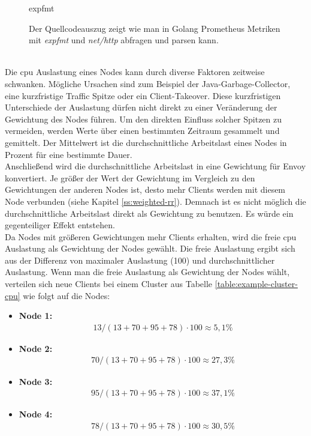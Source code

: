 \begin{figure}
    {expfmt}
    \caption{Der Quellcodeauszug zeigt wie man in Golang Prometheus Metriken mit \textit{expfmt} und \textit{net/http} abfragen und parsen kann.}
    \label{code:expfmt}
\end{figure}
\\
Die \ac{cpu} Auslastung eines Nodes kann durch diverse Faktoren zeitweise schwanken. Mögliche Ursachen sind zum Beispiel der Java-Garbage-Collector, eine kurzfristige Traffic Spitze oder ein Client-Takeover.
Diese kurzfristigen Unterschiede der Auslastung dürfen nicht direkt zu einer Veränderung der Gewichtung des Nodes führen.
Um den direkten Einfluss solcher Spitzen zu vermeiden, werden Werte über einen bestimmten Zeitraum gesammelt und gemittelt. Der Mittelwert ist die durchschnittliche Arbeitslast eines Nodes in Prozent für eine bestimmte Dauer.
\\
Anschlie{\ss}end wird die durchschnittliche Arbeitslast in eine Gewichtung für Envoy konvertiert.
Je grö{\ss}er der Wert der Gewichtung im Vergleich zu den Gewichtungen der anderen Nodes ist, desto mehr Clients werden mit diesem Node verbunden (siehe Kapitel \ref{ss:weighted-rr}).
Demnach ist es nicht möglich die durchschnittliche Arbeitslast direkt als Gewichtung zu benutzen. Es würde ein gegenteiliger Effekt entstehen.
\\
Da Nodes mit grö{\ss}eren Gewichtungen mehr Clients erhalten, wird die freie \ac{cpu} Auslastung als Gewichtung der Nodes gewählt.
Die freie Auslastung ergibt sich aus der Differenz von maximaler Auslastung (100) und durchschnittlicher Auslastung.
Wenn man die freie Auslastung als Gewichtung der Nodes wählt, verteilen sich neue Clients bei einem Cluster aus Tabelle \ref{table:example-cluster-cpu} wie folgt auf die Nodes:
\begin{itemize}
  \item \textbf{Node 1:}
    \begin{align}
      13 / (13 + 70 + 95 + 78) \cdot 100 \approx 5,1 \%
    \end{align}
  \item \textbf{Node 2:}
    \begin{align}
      70 / (13 + 70 + 95 + 78) \cdot 100 \approx 27,3 \%
    \end{align}
  \item \textbf{Node 3:}
    \begin{align}
      95 / (13 + 70 + 95 + 78) \cdot 100 \approx 37,1 \%
    \end{align}
  \item \textbf{Node 4:}
    \begin{align}
      78 / (13 + 70 + 95 + 78) \cdot 100 \approx 30,5 \%
    \end{align}
\end{itemize}
